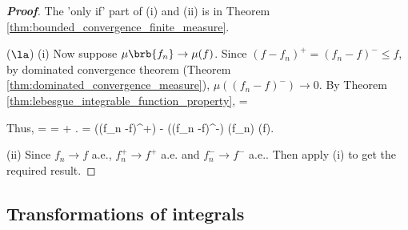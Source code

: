 \begin{proof}[\bf Proof]
The 'only if' part of (i) and (ii) is in Theorem \ref{thm:bounded_convergence_finite_measure}.

($\la$) (i) Now suppose $\mu\brb{f_n}\to \mu(f)$. Since $(f-f_n)^+ = (f_n -f)^- \leq f$, by dominated convergence theorem (Theorem \ref{thm:dominated_convergence_measure}), $\mu((f_n - f)^-) \to 0$. By Theorem \ref{thm:lebesgue_integrable_function_property},
\be
{} =  \leq \mu{} 
\ee

Thus,
\be
{} =  = \leq {} + .
\ee
\be
\ra\quad\quad \mu{} = \mu((f_n -f)^+) - \mu((f_n -f)^-)  \quad \ra\quad \mu(f_n) \to \mu(f).
\ee

(ii) Since $f_n \to f$ a.e., $f_n^+ \to f^+$ a.e. and $f_n^- \to f^-$ a.e.. Then apply (i) to get the required result.
\end{proof}


\subsection{Transformations of integrals}

